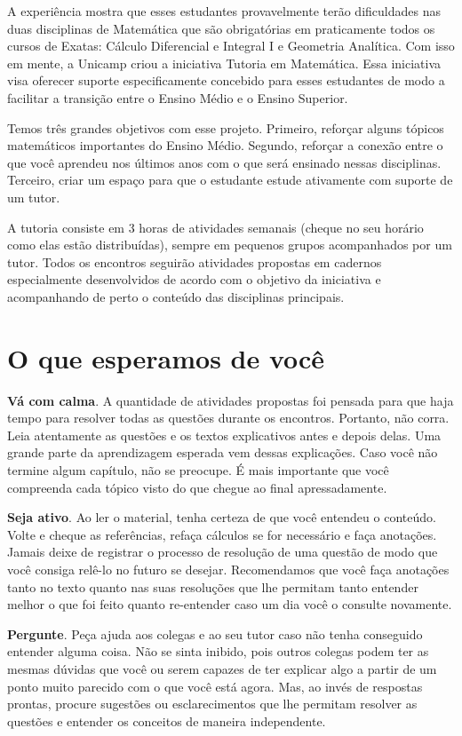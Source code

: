 \documentclass[10pt,openany,twoside=semi]{book}
\theoremstyle{estiloQuestao}
\theoremstyle{estiloQuestao}
\theoremstyle{estiloQuestao}
\theoremstyle{plain}
\theoremstyle{estiloSetinha}
\theoremstyle{estiloSetinha}
\theoremstyle{estiloSetinha}
\theoremstyle{estiloSetinha}
\begin{document}
A experiência mostra que esses estudantes provavelmente terão dificuldades nas duas disciplinas de Matemática que são obrigatórias em praticamente todos os cursos de Exatas: Cálculo Diferencial e Integral I e Geometria Analítica. Com isso em mente, a Unicamp criou a iniciativa Tutoria em Matemática. Essa iniciativa visa oferecer suporte especificamente concebido para esses estudantes de modo a facilitar a transição entre o Ensino Médio e o Ensino Superior.

Temos três grandes objetivos com esse projeto. Primeiro, reforçar alguns tópicos matemáticos importantes do Ensino Médio. Segundo, reforçar a conexão entre o que você aprendeu nos últimos anos com o que será ensinado nessas disciplinas. Terceiro, criar um espaço para que o estudante estude ativamente com suporte de um tutor.

A tutoria consiste em 3 horas de atividades semanais (cheque no seu horário como elas estão distribuídas), sempre em pequenos grupos acompanhados por um tutor. Todos os encontros seguirão atividades propostas em cadernos especialmente desenvolvidos de acordo com o objetivo da iniciativa e acompanhando de perto o conteúdo das disciplinas principais.

\section{O que esperamos de você}

\textbf{Vá com calma}. A quantidade de atividades propostas foi pensada para que haja tempo para resolver todas as questões durante os encontros. Portanto, não corra. Leia atentamente as questões e os textos explicativos antes e depois delas. Uma grande parte da aprendizagem esperada vem dessas explicações. Caso você não termine algum capítulo, não se preocupe. É mais importante que você compreenda cada tópico visto do que chegue ao final apressadamente.
 
\textbf{Seja ativo}. Ao ler o material, tenha certeza de que você entendeu o conteúdo. Volte e cheque as referências, refaça cálculos se for necessário e faça anotações. Jamais deixe de registrar o processo de resolução de uma questão de modo que você consiga relê-lo no futuro se desejar. Recomendamos que você faça anotações tanto no texto quanto nas suas resoluções que lhe permitam tanto entender  melhor o que foi feito quanto re-entender caso um dia você o consulte novamente. 

\textbf{Pergunte}. Peça ajuda aos colegas e ao seu tutor caso não tenha conseguido entender alguma coisa. Não se sinta inibido, pois outros colegas podem ter as mesmas dúvidas que você ou serem capazes de ter explicar algo a partir de um ponto muito parecido com o que você está agora. Mas, ao invés de respostas prontas, procure sugestões ou esclarecimentos que lhe permitam resolver as questões e entender os conceitos de maneira independente.
\end{document}
